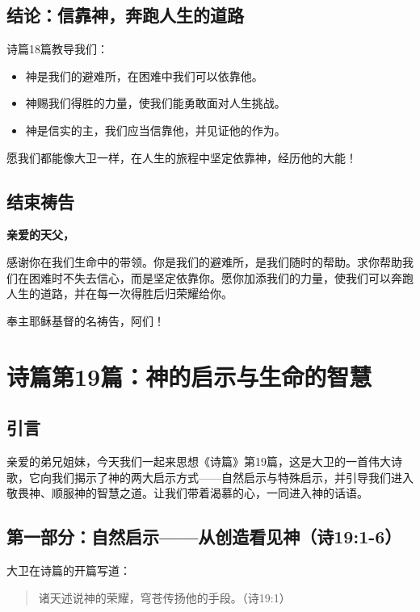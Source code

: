 \documentclass[a4paper, 12pt]{article}
\begin{document}
\subsection*{结论：信靠神，奔跑人生的道路}

诗篇18篇教导我们：
\begin{itemize}
    \item 神是我们的避难所，在困难中我们可以依靠他。
    \item 神赐我们得胜的力量，使我们能勇敢面对人生挑战。
    \item 神是信实的主，我们应当信靠他，并见证他的作为。
\end{itemize}

愿我们都能像大卫一样，在人生的旅程中坚定依靠神，经历他的大能！

\subsection*{结束祷告}

\textbf{亲爱的天父，}

感谢你在我们生命中的带领。你是我们的避难所，是我们随时的帮助。求你帮助我们在困难时不失去信心，而是坚定依靠你。愿你加添我们的力量，使我们可以奔跑人生的道路，并在每一次得胜后归荣耀给你。

奉主耶稣基督的名祷告，阿们！
\newpage
\section{诗篇第19篇：神的启示与生命的智慧}

\subsection*{引言}

亲爱的弟兄姐妹，今天我们一起来思想《诗篇》第19篇，这是大卫的一首伟大诗歌，它向我们揭示了神的两大启示方式——自然启示与特殊启示，并引导我们进入敬畏神、顺服神的智慧之道。让我们带着渴慕的心，一同进入神的话语。

\subsection*{第一部分：自然启示——从创造看见神（诗19:1-6）}

大卫在诗篇的开篇写道：

\begin{quote}
诸天述说神的荣耀，穹苍传扬他的手段。（诗19:1）
\end{quote}
\end{document}
